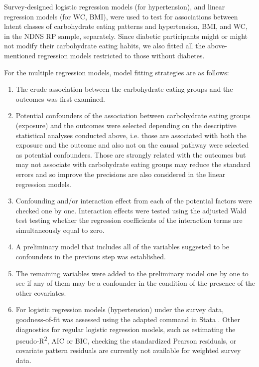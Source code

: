 

Survey-designed logistic regression models (for hypertension), and linear regression models (for WC, BMI), were used to test for associations between latent classes of carbohydrate eating patterns and hypertension, BMI, and WC, in the NDNS RP sample, separately. Since diabetic participants might or might not modify their carbohydrate eating habits, we also fitted all the above-mentioned regression models restricted to those without diabetes.

For the multiple regression models, model fitting strategies are as follows: 

\begin{enumerate}
	\item The crude association between the carbohydrate eating groups and the outcomes was first examined. 
	\item Potential confounders of the association between carbohydrate eating groups (exposure) and the outcomes were selected depending on the descriptive statistical analyses conducted above, i.e. those are associated with both the exposure and the outcome and also not on the causal pathway were selected as potential confounders. Those are strongly related with the outcomes but may not associate with carbohydrate eating groups may reduce the standard errors and so improve the precisions are also considered in the linear regression models. 
	\item Confounding and/or interaction effect from each of the potential factors were checked one by one. Interaction effects were tested using the adjusted Wald test testing whether the regression coefficients of the interaction terms are simultaneously equal to zero.  
	\item A preliminary model that includes all of the variables suggested to be confounders in the previous step was established. 
	\item The remaining variables were added to the preliminary model one by one to see if any of them may be a confounder in the condition of the presence of the other covariates. 
	\item For logistic regression models (hypertension) under the survey data, goodness-of-fit was assessed using the adapted  command in Stata \parencite{archer2006goodness}. Other diagnostics for regular logistic regression models, such as estimating the pseudo-R\textsuperscript{2},  AIC or BIC, checking the standardized Pearson residuals, or covariate pattern residuals are currently not available for weighted survey data. 

\end{enumerate}
